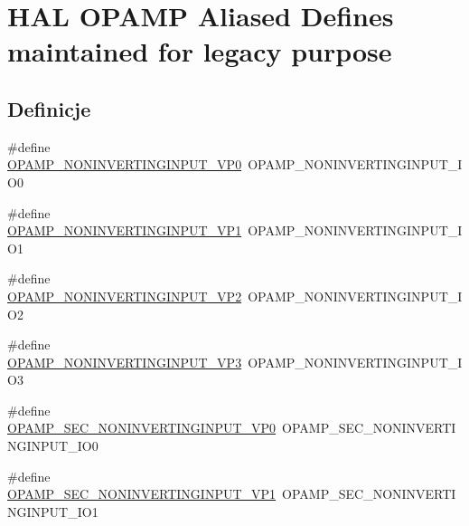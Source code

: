 \hypertarget{group___h_a_l___o_p_a_m_p___aliased___defines}{}\section{H\+AL O\+P\+A\+MP Aliased Defines maintained for legacy purpose}
\label{group___h_a_l___o_p_a_m_p___aliased___defines}
\subsection*{Definicje}
\begin{DoxyCompactItemize}
\item 
\#define \hyperlink{group___h_a_l___o_p_a_m_p___aliased___defines_ga0c8a66d4ef4f3e5ddff93741d59730a9}{O\+P\+A\+M\+P\+\_\+\+N\+O\+N\+I\+N\+V\+E\+R\+T\+I\+N\+G\+I\+N\+P\+U\+T\+\_\+\+V\+P0}~O\+P\+A\+M\+P\+\_\+\+N\+O\+N\+I\+N\+V\+E\+R\+T\+I\+N\+G\+I\+N\+P\+U\+T\+\_\+\+I\+O0
\item 
\#define \hyperlink{group___h_a_l___o_p_a_m_p___aliased___defines_ga2373d73432511331d18e850f2cbcb637}{O\+P\+A\+M\+P\+\_\+\+N\+O\+N\+I\+N\+V\+E\+R\+T\+I\+N\+G\+I\+N\+P\+U\+T\+\_\+\+V\+P1}~O\+P\+A\+M\+P\+\_\+\+N\+O\+N\+I\+N\+V\+E\+R\+T\+I\+N\+G\+I\+N\+P\+U\+T\+\_\+\+I\+O1
\item 
\#define \hyperlink{group___h_a_l___o_p_a_m_p___aliased___defines_gaefe0c48289b99fc2a72078562ab1bbce}{O\+P\+A\+M\+P\+\_\+\+N\+O\+N\+I\+N\+V\+E\+R\+T\+I\+N\+G\+I\+N\+P\+U\+T\+\_\+\+V\+P2}~O\+P\+A\+M\+P\+\_\+\+N\+O\+N\+I\+N\+V\+E\+R\+T\+I\+N\+G\+I\+N\+P\+U\+T\+\_\+\+I\+O2
\item 
\#define \hyperlink{group___h_a_l___o_p_a_m_p___aliased___defines_ga45a66909e6190a2cef2b6cb1a623ef3e}{O\+P\+A\+M\+P\+\_\+\+N\+O\+N\+I\+N\+V\+E\+R\+T\+I\+N\+G\+I\+N\+P\+U\+T\+\_\+\+V\+P3}~O\+P\+A\+M\+P\+\_\+\+N\+O\+N\+I\+N\+V\+E\+R\+T\+I\+N\+G\+I\+N\+P\+U\+T\+\_\+\+I\+O3
\item 
\#define \hyperlink{group___h_a_l___o_p_a_m_p___aliased___defines_ga0ca7da83e2be923743de9b1fa58e0b01}{O\+P\+A\+M\+P\+\_\+\+S\+E\+C\+\_\+\+N\+O\+N\+I\+N\+V\+E\+R\+T\+I\+N\+G\+I\+N\+P\+U\+T\+\_\+\+V\+P0}~O\+P\+A\+M\+P\+\_\+\+S\+E\+C\+\_\+\+N\+O\+N\+I\+N\+V\+E\+R\+T\+I\+N\+G\+I\+N\+P\+U\+T\+\_\+\+I\+O0
\item 
\#define \hyperlink{group___h_a_l___o_p_a_m_p___aliased___defines_ga044a5996a702fe67bd404674d6ce2890}{O\+P\+A\+M\+P\+\_\+\+S\+E\+C\+\_\+\+N\+O\+N\+I\+N\+V\+E\+R\+T\+I\+N\+G\+I\+N\+P\+U\+T\+\_\+\+V\+P1}~O\+P\+A\+M\+P\+\_\+\+S\+E\+C\+\_\+\+N\+O\+N\+I\+N\+V\+E\+R\+T\+I\+N\+G\+I\+N\+P\+U\+T\+\_\+\+I\+O1

\end{DoxyCompactItemize}
